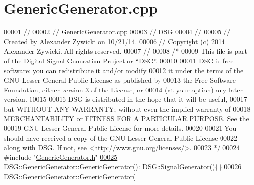 \hypertarget{_generic_generator_8cpp_source}{\section{Generic\+Generator.\+cpp}
\label{_generic_generator_8cpp_source}
}

\begin{DoxyCode}
00001 \textcolor{comment}{//}
00002 \textcolor{comment}{//  GenericGenerator.cpp}
00003 \textcolor{comment}{//  DSG}
00004 \textcolor{comment}{//}
00005 \textcolor{comment}{//  Created by Alexander Zywicki on 10/21/14.}
00006 \textcolor{comment}{//  Copyright (c) 2014 Alexander Zywicki. All rights reserved.}
00007 \textcolor{comment}{//}
00008 \textcolor{comment}{/*}
00009 \textcolor{comment}{ This file is part of the Digital Signal Generation Project or “DSG”.}
00010 \textcolor{comment}{}
00011 \textcolor{comment}{ DSG is free software: you can redistribute it and/or modify}
00012 \textcolor{comment}{ it under the terms of the GNU Lesser General Public License as published by}
00013 \textcolor{comment}{ the Free Software Foundation, either version 3 of the License, or}
00014 \textcolor{comment}{ (at your option) any later version.}
00015 \textcolor{comment}{}
00016 \textcolor{comment}{ DSG is distributed in the hope that it will be useful,}
00017 \textcolor{comment}{ but WITHOUT ANY WARRANTY; without even the implied warranty of}
00018 \textcolor{comment}{ MERCHANTABILITY or FITNESS FOR A PARTICULAR PURPOSE.  See the}
00019 \textcolor{comment}{ GNU Lesser General Public License for more details.}
00020 \textcolor{comment}{}
00021 \textcolor{comment}{ You should have received a copy of the GNU Lesser General Public License}
00022 \textcolor{comment}{ along with DSG.  If not, see <http://www.gnu.org/licenses/>.}
00023 \textcolor{comment}{ */}
00024 \textcolor{preprocessor}{#include "\hyperlink{_generic_generator_8h}{GenericGenerator.h}"}
\hypertarget{_generic_generator_8cpp_source_l00025}{}\hyperlink{class_d_s_g_1_1_generic_generator_a560df325ce43fa9a1baf4463ccaed2d3}{00025} \hyperlink{class_d_s_g_1_1_generic_generator_a560df325ce43fa9a1baf4463ccaed2d3}{DSG::GenericGenerator::GenericGenerator}():
      \hyperlink{namespace_d_s_g}{DSG}::\hyperlink{class_d_s_g_1_1_signal_generator}{SignalGenerator}()\{\}
\hypertarget{_generic_generator_8cpp_source_l00026}{}\hyperlink{class_d_s_g_1_1_generic_generator_a1dbab25aa71cb7bce7e4b02be5122244}{00026} \hyperlink{class_d_s_g_1_1_generic_generator_a560df325ce43fa9a1baf4463ccaed2d3}{DSG::GenericGenerator::GenericGenerator}(

\end{DoxyCode}
